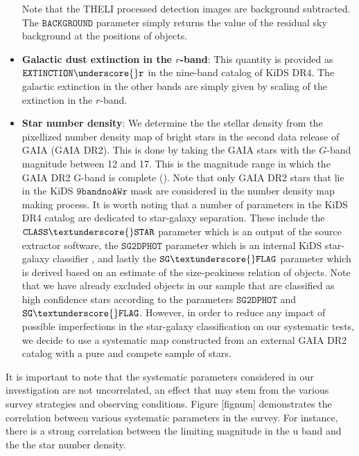 \documentclass[fleqn,usenatbib,useAMS]{mnras}
\begin{document}
\begin{itemize}
  Note that the THELI processed detection images are background subtracted. The $\mathtt{BACKGROUND}$ parameter simply returns the value of the residual sky background at the positions of 
  objects.
  \item \textbf{Galactic dust extinction in the $r$-band}: This quantity is provided as $\mathtt{EXTINCTION\underscore{}r}$ in the nine-band catalog of KiDS DR4. The galactic extinction in the other bands are simply given by scaling of the extinction in the $r$-band.   
  \item \textbf{Star number density}: We determine the the stellar density from the pixellized number density map of bright stars in the second data release of GAIA (GAIA DR2). This is done by taking the GAIA stars with the $G$-band magnitude between 12 and 17. This is the magnitude range in which the GAIA DR2 G-band is complete (\citealt{gaia0,gaia1}). Note that only GAIA DR2 stars that lie in the KiDS $\mathtt{9bandnoAWr}$ mask are considered in the number density map making process. It is worth noting that a number of parameters in the KiDS DR4 catalog are dedicated to star-galaxy separation. These include the $\mathtt{CLASS\textunderscore{}STAR}$
 parameter which is an output of the source extractor software, the $\mathtt{SG2DPHOT}$ parameter which is an internal KiDS star-galaxy classifier \citep[e.g.][]{kids_dr3, radovich2017}, and lastly the $\mathtt{SG\textunderscore{}FLAG}$ parameter which is derived based on an estimate of the size-peakiness relation of objects. Note that we have already excluded objects in our sample that are classified as high confidence stars according to the parameters $\mathtt{SG2DPHOT}$ and $\mathtt{SG\textunderscore{} FLAG}$. However, in order to reduce any impact of possible imperfections in the star-galaxy classification on our systematic tests, we decide to use a systematic map constructed from an external GAIA DR2 catalog with a pure and compete sample of stars. 
 
\end{itemize}

It is important to note that the systematic parameters considered in our investigation are not uncorrelated, an effect that may stem from the various survey strategies and observing conditions. 
Figure [fignum] demonstrates the correlation between various systematic parameters in the survey. 
For instance, there is a strong correlation between the limiting magnitude in the u band and the the star number density. 
\end{document}
